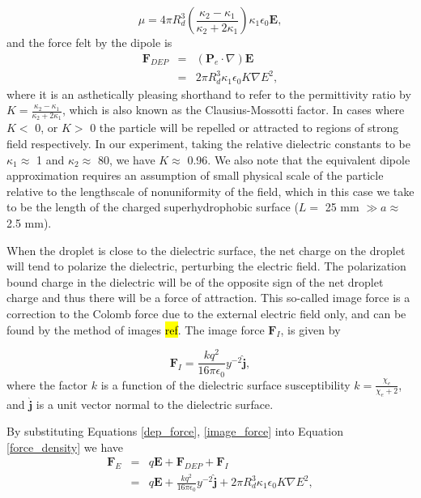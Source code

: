 \documentclass[a4paper, 12pt]{article}
\begin{document}
\begin{equation}\label{dipole_m_2}
\mu = 4 \pi R_d^3 \left( \frac{\kappa_2 - \kappa_1}{\kappa_2 + 2 \kappa_1} \right) \kappa_1 \epsilon_0 \mathbf{E},
\end{equation}
and the force felt by the dipole is 
\begin{eqnarray} \label{dep_force}
\mathbf{F}_{DEP} &=& \left( \mathbf{P}_e \cdot \nabla \right) \mathbf{E} \nonumber \\
&=& 2 \pi R_d^3 \kappa_1 \epsilon_0 K \nabla E^2,
\end{eqnarray}
where it is an asthetically pleasing shorthand to refer to the permittivity ratio by $K = \frac{\kappa_2 - \kappa_1}{\kappa_2 + 2 \kappa_1}$, which is also known as the Clausius-Mossotti factor. In cases where $K <$ 0, or $K>$ 0 the particle will be repelled or attracted to regions of strong field respectively. In our experiment, taking the relative dielectric constants to be $\kappa_1 \approx$ 1 and $\kappa_2 \approx$ 80, we have $K \approx$ 0.96. We also note that the equivalent dipole approximation requires an assumption of small physical scale of the particle relative to the lengthscale of nonuniformity of the field, which in this case we take to be the length of the charged superhydrophobic surface ($L =$ 25 mm $\gg a \approx$ 2.5 mm).

When the droplet is close to the dielectric surface, the net charge on the droplet will tend to polarize the dielectric, perturbing the electric field. The polarization bound charge in the dielectric will be of the opposite sign of the net droplet charge and thus there will be a force of attraction. This so-called image force is a correction to the Colomb force due to the external electric field only, and can be found by the method of images \hl{ref}. The image force $\mathbf{F}_I$, is given by

\begin{equation}
\mathbf{F}_I = \frac{k q^2}{16 \pi \epsilon_0} y^{-2} \hat{\mathbf{j}},
\label{image_force}
\end{equation}
where the factor $k$ is a function of the dielectric surface susceptibility $k = \frac{\chi_e}{\chi_e + 2}$, and $\hat{\mathbf{j}}$ is a unit vector normal to the dielectric surface.

By substituting Equations \ref{dep_force}, \ref{image_force} into Equation \ref{force_density} we have
\begin{eqnarray*}
 \mathbf{F}_E &=& q \mathbf{E} + \mathbf{F}_{DEP} + \mathbf{F}_I \\
 &=& q \mathbf{E} + \frac{k q^2}{16 \pi \epsilon_0 } y^{-2} \hat{\mathbf{j}} + 2 \pi R_d^3 \kappa_1 \epsilon_0 K \nabla E^2, 
\end{eqnarray*}
\end{document}
